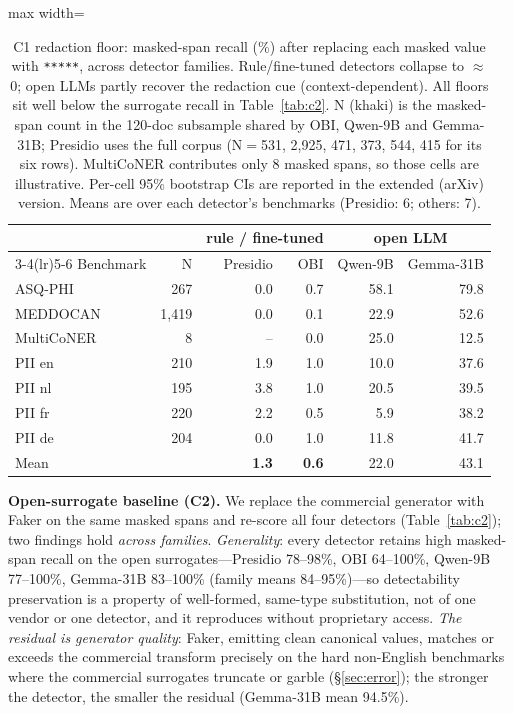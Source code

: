 \documentclass[pmlr,twocolumn,10pt]{jmlr}
\newcommand{\tp}[1]{\texttt{#1}}
\newcommand{\nk}[1]{{\footnotesize\textcolor{ckhaki}{#1}}}
\begin{document}
\begin{table}[t]\centering\small
\begin{adjustbox}{max width=\columnwidth}%
\begin{tabular}{lrrrrr}
\toprule
 & & \multicolumn{2}{c}{rule / fine-tuned} & \multicolumn{2}{c}{open LLM}\\
\cmidrule(lr){3-4}\cmidrule(lr){5-6}
Benchmark & \nk{N} & Presidio & OBI & Qwen-9B & Gemma-31B\\
\midrule
ASQ-PHI & \nk{267} & 0.0 & 0.7 & 58.1 & 79.8\\
MEDDOCAN & \nk{1{,}419} & 0.0 & 0.1 & 22.9 & 52.6\\
MultiCoNER & \nk{8} & -- & 0.0 & 25.0 & 12.5\\
PII en & \nk{210} & 1.9 & 1.0 & 10.0 & 37.6\\
PII nl & \nk{195} & 3.8 & 1.0 & 20.5 & 39.5\\
PII fr & \nk{220} & 2.2 & 0.5 & 5.9 & 38.2\\
PII de & \nk{204} & 0.0 & 1.0 & 11.8 & 41.7\\
\midrule
Mean & & \textbf{1.3} & \textbf{0.6} & 22.0 & 43.1\\
\bottomrule
\end{tabular}
\end{adjustbox}
\caption{C1 redaction floor: masked-span recall (\%) after replacing each masked value with \tp{*****}, across detector families. Rule/fine-tuned detectors collapse to $\approx$0; open LLMs partly recover the redaction cue (context-dependent). All floors sit well below the surrogate recall in Table~\ref{tab:c2}. \nk{N} (khaki) is the masked-span count in the 120-doc subsample shared by OBI, Qwen-9B and Gemma-31B; Presidio uses the full corpus (N${=}$531, 2{,}925, 471, 373, 544, 415 for its six rows). MultiCoNER contributes only 8 masked spans, so those cells are illustrative. Per-cell 95\% bootstrap CIs are reported in the extended (arXiv) version. Means are over each detector's benchmarks (Presidio: 6; others: 7).}\label{tab:c1}
\end{table}

\textbf{Open-surrogate baseline (C2).} We replace the commercial generator with Faker on the same masked spans and re-score all four detectors (Table~\ref{tab:c2}); two findings hold \emph{across families}. \emph{Generality}: every detector retains high masked-span recall on the open surrogates---Presidio 78--98\%, OBI 64--100\%, Qwen-9B 77--100\%, Gemma-31B 83--100\% (family means 84--95\%)---so detectability preservation is a property of well-formed, same-type substitution, not of one vendor or one detector, and it reproduces without proprietary access. \emph{The residual is generator quality}: Faker, emitting clean canonical values, matches or exceeds the commercial transform precisely on the hard non-English benchmarks where the commercial surrogates truncate or garble (\S\ref{sec:error}); the stronger the detector, the smaller the residual (Gemma-31B mean 94.5\%).
\end{document}

